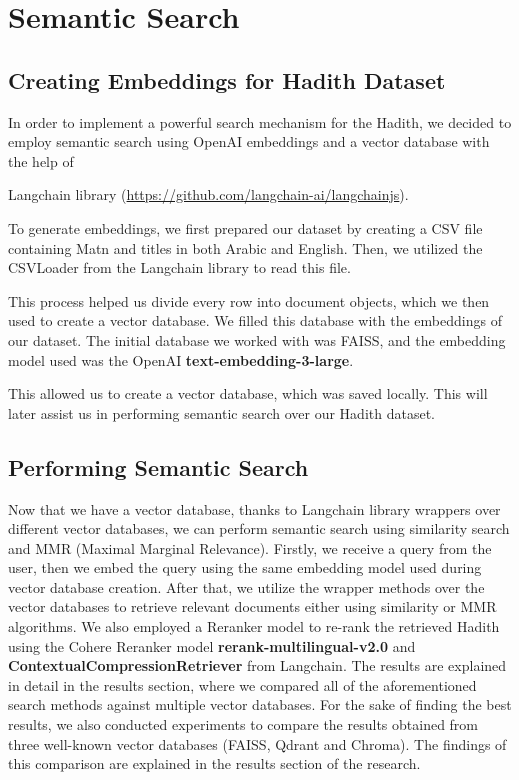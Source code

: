 \section{Semantic Search}

\subsection{Creating Embeddings for Hadith Dataset}

In order to implement a powerful search mechanism for the Hadith, we decided to employ semantic search using OpenAI embeddings and a vector database with the help of

 Langchain library (\url{https://github.com/langchain-ai/langchainjs}).

To generate embeddings, we first prepared our dataset by creating a CSV file containing Matn and titles in both Arabic and English. Then, we utilized the CSVLoader from the Langchain library to read this file.

This process helped us divide every row into document objects, which we then used to create a vector database. We filled this database with the embeddings of our dataset. The initial database we worked with was FAISS, and the embedding model used was the OpenAI \textbf{text-embedding-3-large}.

This allowed us to create a vector database, which was saved locally. This will later assist us in performing semantic search over our Hadith dataset.

\subsection{Performing Semantic Search}

Now that we have a vector database, thanks to Langchain library wrappers over different vector databases, we can perform semantic search using similarity search and MMR (Maximal Marginal Relevance). Firstly, we receive a query from the user, then we embed the query using the same embedding model used during vector database creation. After that, we utilize the wrapper methods over the vector databases to retrieve relevant documents either using similarity or MMR algorithms. We also employed a Reranker model to re-rank the retrieved Hadith using the Cohere Reranker model \textbf{rerank-multilingual-v2.0} and \textbf{ContextualCompressionRetriever} from Langchain. The results are explained in detail in the results section, where we compared all of the aforementioned search methods against multiple vector databases. For the sake of finding the best results, we also conducted experiments to compare the results obtained from three well-known vector databases (FAISS, Qdrant and Chroma). The findings of this comparison are explained in the results section of the research.

